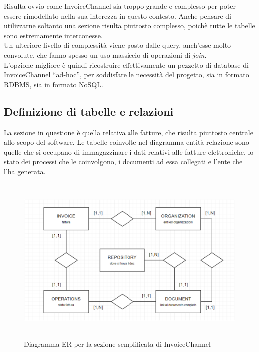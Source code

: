 \noindent Risulta ovvio come InvoiceChannel sia troppo grande e complesso per poter essere rimodellato nella sua interezza in questo contesto. Anche pensare di utilizzarne soltanto una sezione risulta piuttosto complesso, poichè tutte le tabelle sono estremamente interconesse.\\
Un ulteriore livello di complessità viene posto dalle query, anch'esse molto convolute, che fanno spesso un uso massiccio di operazioni di \textit{join}.\\
L'opzione migliore è quindi ricostruire effettivamente un pezzetto di database di InvoiceChannel ``ad-hoc'', per soddisfare le necessità del progetto, sia in formato RDBMS, sia in formato NoSQL.\\

\subsection{Definizione di tabelle e relazioni}
La sezione in questione è quella relativa alle fatture, che risulta piuttosto centrale allo scopo del software. Le tabelle coinvolte nel diagramma entità-relazione sono quelle che si occupano di immagazzinare i dati relativi alle fatture elettroniche, lo stato dei processi che le coinvolgono, i documenti ad essa collegati e l'ente che l'ha generata.\\

\begin{figure}[htbp]
\begin{center}
\includegraphics[height=22em]{immagini/ER-Mock-IC.png}
\caption{Diagramma ER per la sezione semplificata di InvoiceChannel}\label{img:schema-er}
\end{center}
\end{figure}

